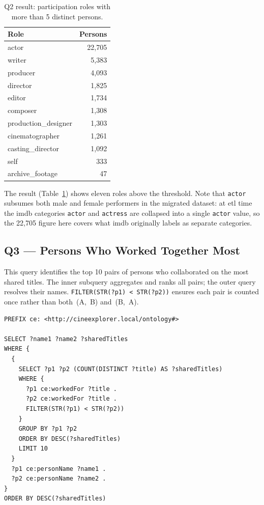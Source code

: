 \begin{table}[H]
\centering
\begin{tabular}{lr}
\hline
\textbf{Role} & \textbf{Persons} \\
\hline
actor               & 22{,}705 \\
writer              & 5{,}383  \\
producer            & 4{,}093  \\
director            & 1{,}825  \\
editor              & 1{,}734  \\
composer            & 1{,}308  \\
production\_designer & 1{,}303  \\
cinematographer     & 1{,}261  \\
casting\_director    & 1{,}092  \\
self                & 333      \\
archive\_footage     & 47       \\
\hline
\end{tabular}
\caption{Q2 result: participation roles with more than 5 distinct persons.}
\label{tab:q2-results}
\end{table}

The result (Table~\ref{tab:q2-results}) shows eleven roles above the threshold. Note that \texttt{actor} subsumes both male and female performers in the migrated dataset: at \ac{etl} time the \ac{imdb} categories \texttt{actor} and \texttt{actress} are collapsed into a single \texttt{actor} value, so the 22{,}705 figure here covers what \ac{imdb} originally labels as separate categories.

\subsection{Q3 — Persons Who Worked Together Most}

This query identifies the top 10 pairs of persons who collaborated on the most shared titles. The inner subquery aggregates and ranks all pairs; the outer query resolves their names. \texttt{FILTER(STR(?p1) < STR(?p2))} ensures each pair is counted once rather than both~(A,~B) and~(B,~A).

\begin{lstlisting}[language=SPARQL]
PREFIX ce: <http://cineexplorer.local/ontology#>

SELECT ?name1 ?name2 ?sharedTitles
WHERE {
  {
    SELECT ?p1 ?p2 (COUNT(DISTINCT ?title) AS ?sharedTitles)
    WHERE {
      ?p1 ce:workedFor ?title .
      ?p2 ce:workedFor ?title .
      FILTER(STR(?p1) < STR(?p2))
    }
    GROUP BY ?p1 ?p2
    ORDER BY DESC(?sharedTitles)
    LIMIT 10
  }
  ?p1 ce:personName ?name1 .
  ?p2 ce:personName ?name2 .
}
ORDER BY DESC(?sharedTitles)
\end{lstlisting}

